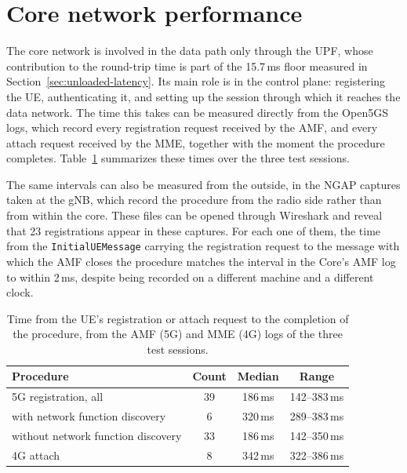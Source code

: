 \section{Core network performance}
\label{sec:core-performance}

The core network is involved in the data path only through the \gls{UPF}, whose contribution to the round-trip time is part of the 15.7\,ms floor measured in Section~\ref{sec:unloaded-latency}. Its main role is in the control plane: registering the \gls{UE}, authenticating it, and setting up the session through which it reaches the data network. The time this takes can be measured directly from the Open5GS logs, which record every registration request received by the \gls{AMF}, and every attach request received by the \gls{MME}, together with the moment the procedure completes. Table~\ref{tab:registration-time} summarizes these times over the three test sessions.

The same intervals can also be measured from the outside, in the \gls{NGAP} captures taken at the \gls{gNB}, which record the procedure from the radio side rather than from within the core. These files can be opened through Wireshark and reveal that 23 registrations appear in these captures. For each one of them, the time from the \texttt{InitialUEMessage} carrying the registration request to the message with which the \gls{AMF} closes the procedure matches the interval in the Core's \gls{AMF} log to within 2\,ms, despite being recorded on a different machine and a different clock.

\begin{table}[htbp]
    \centering
    \begin{tabular}{|l|c|c|c|}
        \hline
        \textbf{Procedure} & \textbf{Count} & \textbf{Median} & \textbf{Range} \\
        \hline
        5G registration, all & 39 & 186\,ms & 142--383\,ms \\
        \hline
        \quad with network function discovery & 6 & 320\,ms & 289--383\,ms \\
        \hline
        \quad without network function discovery & 33 & 186\,ms & 142--350\,ms \\
        \hline
        4G attach & 8 & 342\,ms & 322--386\,ms \\
        \hline
    \end{tabular}
    \caption[5G registration and 4G attach times.]{Time from the \gls{UE}'s registration or attach request to the completion of the procedure, from the \gls{AMF} (5G) and \gls{MME} (4G) logs of the three test sessions.}
    \label{tab:registration-time}
\end{table}


